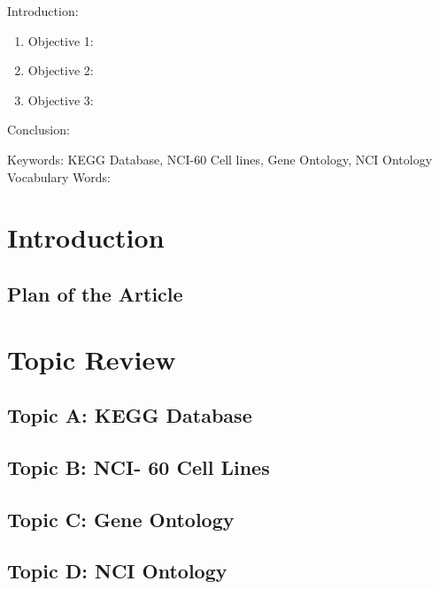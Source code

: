 

\twocolumn
\scriptsize
\begin{frontmatter}
		\title{}
		\author{}
		\address{The Mathematical Learning Space}
\end{frontmatter}	

Introduction:
\begin{enumerate}
\item Objective 1:
\item Objective 2:
\item Objective 3:
\end{enumerate}
Conclusion:

Keywords: KEGG Database, NCI-60 Cell lines, Gene Ontology, NCI Ontology
Vocabulary Words:

\section{Introduction}

\subsection{Plan of the Article}


\section{Topic Review}

\subsection{Topic A: KEGG Database}

\subsection{Topic B: NCI- 60 Cell Lines}

\subsection{Topic C: Gene Ontology}

\subsection{Topic D: NCI Ontology}

